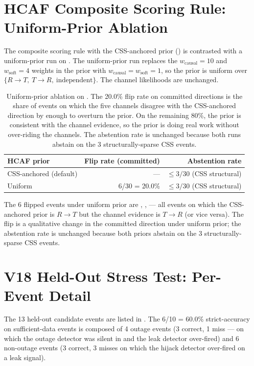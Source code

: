 \documentclass[sigcomm,nonatbib]{acmart}
\begin{document}
\section{HCAF Composite Scoring Rule: Uniform-Prior Ablation}
\label{sec:supp-uniform-prior}

The composite scoring rule with the CSS-anchored prior
() is contrasted with a
uniform-prior run on . The uniform-prior run
replaces the $w_{\text{causal}} = 10$ and
$w_{\text{soft}} = 4$ weights in the prior with
$w_{\text{causal}} = w_{\text{soft}} = 1$, so the
prior is uniform over $\{R\!\to\!T,\ T\!\to\!R,\
\text{independent}\}$. The channel likelihoods are
unchanged.

\begin{table}[h]
\centering
\small
\setlength{\tabcolsep}{4pt}
\begin{tabular}{p{}rr}
\hline
HCAF prior & Flip rate (committed) & Abstention rate \\ \hline
CSS-anchored (default) & --- & $\leq 3/30$ (CSS structural) \\
Uniform & 6/30 = 20.0\% & $\leq 3/30$ (CSS structural) \\
\hline
\end{tabular}

\caption{Uniform-prior ablation on . The 20.0\%
flip rate on committed directions is the share of
events on which the five channels disagree with the
CSS-anchored direction by enough to overturn the
prior. On the remaining 80\%, the prior is consistent
with the channel evidence, so the prior is doing
real work without over-riding the channels. The
abstention rate is unchanged because both runs
abstain on the 3 structurally-sparse CSS events.}
\label{tab:supp-uniform-prior}
\end{table}

The 6 flipped events under uniform prior are
,
,
 --- all
events on which the CSS-anchored prior is
$R\!\to\!T$ but the channel evidence is
$T\!\to\!R$ (or vice versa). The flip is a
qualitative change in the committed direction
under uniform prior; the abstention rate is
unchanged because both priors abstain on the
3 structurally-sparse CSS events.

\section{V18 Held-Out Stress Test: Per-Event Detail}
\label{sec:supp-heldout}

The 13 held-out candidate events are listed in
. The 6/10 = 60.0\%
strict-accuracy on sufficient-data events is
composed of 4 outage events (3 correct, 1
miss --- on
which the outage detector was silent in
 and the leak detector
over-fired) and 6 non-outage events (3 correct,
3 misses on which the hijack detector over-fired
on a leak signal).
\end{document}
